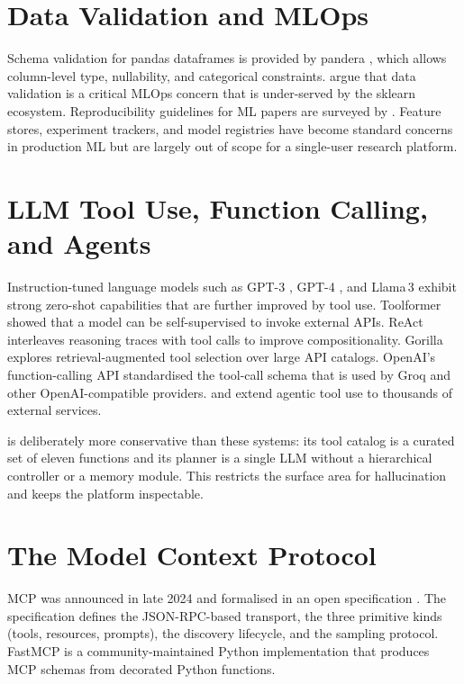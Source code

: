 \section{Data Validation and MLOps}
\label{sec:lit-mlops}

Schema validation for pandas dataframes is provided by pandera
\citep{pandera}, which allows column-level type, nullability, and
categorical constraints. \citet{polyzotis2018dataval,
schelter2018data} argue that data validation is a critical
MLOps concern that is under-served by the sklearn ecosystem.
Reproducibility guidelines for ML papers are surveyed by
\citet{pineau2021reproducibility}. Feature stores, experiment
trackers, and model registries have become standard concerns in
production ML but are largely out of scope for a single-user
research platform.

\section{LLM Tool Use, Function Calling, and Agents}
\label{sec:lit-llm-tools}

Instruction-tuned language models such as GPT-3
\citep{brown2020gpt3}, GPT-4 \citep{openai2023gpt4}, and Llama\,3
\citep{llama3card, touvron2023llama} exhibit strong zero-shot
capabilities that are further improved by tool use. Toolformer
\citep{schick2023toolformer} showed that a model can be
self-supervised to invoke external APIs. ReAct \citep{yao2023react}
interleaves reasoning traces with tool calls to improve
compositionality. Gorilla \citep{patil2023gorilla} explores
retrieval-augmented tool selection over large API catalogs. OpenAI's
function-calling API \citep{openai2023function} standardised the
tool-call schema that is used by Groq and other OpenAI-compatible
providers. \citet{qin2024toolllm} and \citet{shen2024hugginggpt}
extend agentic tool use to thousands of external services.

\projname{} is deliberately more conservative than these systems:
its tool catalog is a curated set of eleven functions and its
planner is a single LLM without a hierarchical controller or a
memory module. This restricts the surface area for hallucination and
keeps the platform inspectable.

\section{The Model Context Protocol}
\label{sec:lit-mcp}

MCP was announced in late 2024 \citep{anthropic2024mcp} and
formalised in an open specification \citep{mcpSpec2024}. The
specification defines the JSON-RPC-based transport, the three
primitive kinds (tools, resources, prompts), the discovery lifecycle,
and the sampling protocol. FastMCP \citep{fastmcp} is a
community-maintained Python implementation that produces MCP
schemas from decorated Python functions.


